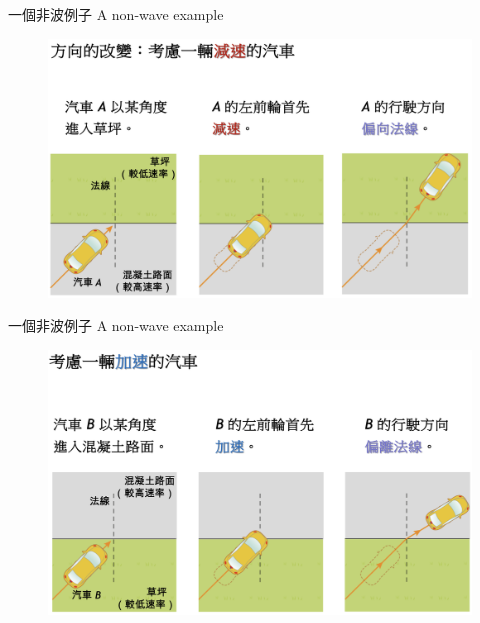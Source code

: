 \documentclass[beamer=true]{standalone}
\begin{document}
\begin{frame}{一個非波例子 A non-wave example}
    \begin{figure}
        \centering
        \includegraphics[width=1\linewidth]{images/Screenshot 2023-09-27 at 9.43.07 PM.png}


    \end{figure}
\end{frame}

\begin{frame}{一個非波例子 A non-wave example}
    \begin{figure}
        \centering
        \includegraphics[width=1\linewidth]{images/Screenshot 2023-09-27 at 9.43.15 PM.png}


    \end{figure}
\end{frame}
\end{document}
